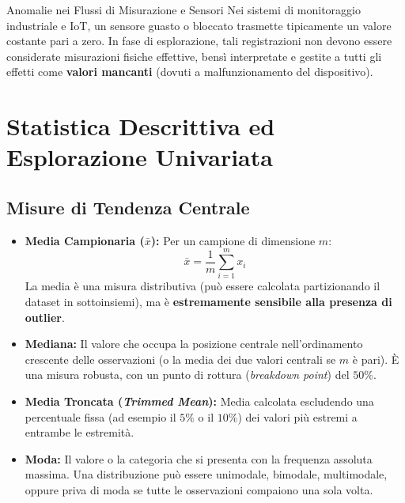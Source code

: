 \begin{noteblock}{Anomalie nei Flussi di Misurazione e Sensori}
Nei sistemi di monitoraggio industriale e IoT, un sensore guasto o bloccato trasmette tipicamente un valore costante pari a zero. In fase di esplorazione, tali registrazioni non devono essere considerate misurazioni fisiche effettive, bensì interpretate e gestite a tutti gli effetti come \textbf{valori mancanti} (dovuti a malfunzionamento del dispositivo).
\end{noteblock}

\section{Statistica Descrittiva ed Esplorazione Univariata}

\subsection{Misure di Tendenza Centrale}
\begin{itemize}
    \item \textbf{Media Campionaria ($\bar{x}$):} Per un campione di dimensione $m$:
    \begin{equation}
    \bar{x} = \frac{1}{m} \sum_{i=1}^m x_i
    \end{equation}
    La media è una misura distributiva (può essere calcolata partizionando il dataset in sottoinsiemi), ma è \textbf{estremamente sensibile alla presenza di outlier}.
    \item \textbf{Mediana:} Il valore che occupa la posizione centrale nell'ordinamento crescente delle osservazioni (o la media dei due valori centrali se $m$ è pari). È una misura robusta, con un punto di rottura (\textit{breakdown point}) del $50\%$.
    \item \textbf{Media Troncata (\textit{Trimmed Mean}):} Media calcolata escludendo una percentuale fissa (ad esempio il $5\%$ o il $10\%$) dei valori più estremi a entrambe le estremità.
    \item \textbf{Moda:} Il valore o la categoria che si presenta con la frequenza assoluta massima. Una distribuzione può essere unimodale, bimodale, multimodale, oppure priva di moda se tutte le osservazioni compaiono una sola volta.
\end{itemize}


